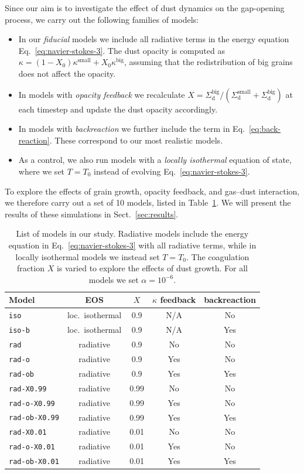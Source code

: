 \documentclass[fleqn,usenatbib,useAMS]{mnras}
\newcommand{\Sigmad}{\Sigma_\mathrm{d}}
\begin{document}
Since our aim is to investigate the effect of dust dynamics on the gap-opening process, we carry out the following families of models:
\begin{itemize}
	\item In our \emph{fiducial} models we include all radiative terms in the energy equation Eq.~\eqref{eq:navier-stokes-3}. The dust opacity is computed as $\kappa=(1-X_0)\kappa^\text{small} + X_0\kappa^\text{big}$, assuming that the redistribution of big grains does not affect the opacity.
	\item In models with \emph{opacity feedback} we recalculate $X=\Sigmad^\text{big}/(\Sigmad^\text{small}+\Sigmad^\text{big})$ at each timestep and update the dust opacity accordingly.
	\item In models with \emph{backreaction} we further include the term in Eq.~\eqref{eq:back-reaction}. These correspond to our most realistic models.
	\item As a control, we also run models with a \emph{locally isothermal} equation of state, where we set $T=T_0$ instead of evolving Eq.~\eqref{eq:navier-stokes-3}.
\end{itemize}

To explore the effects of grain growth, opacity feedback, and gas--dust interaction, we therefore carry out a set of 10 models, listed in Table~\ref{table:models}. We will present the results of these simulations in Sect.~\ref{sec:results}.

\begin{table}
	\centering
	\caption{List of models in our study. Radiative models include the energy equation in Eq.~\eqref{eq:navier-stokes-3} with all radiative terms, while in locally isothermal models we instead set $T=T_0$. The coagulation fraction $X$ is varied to explore the effects of dust growth. For all models we set $\alpha=10^{-6}$.}
	\label{table:models}
	\begin{tabular}{lcccc}
		\hline
		Model & EOS & $X$ & $\kappa$ feedback & backreaction\\
		\hline
		\texttt{iso} & loc.~isothermal & 0.9 & N/A & No\\
		\texttt{iso-b} & loc.~isothermal & 0.9 & N/A & Yes\\
		\texttt{rad} & radiative & 0.9 & No & No\\
		\texttt{rad-o} & radiative & 0.9 & Yes & No\\
		\texttt{rad-ob} & radiative & 0.9 & Yes & Yes\\
		\texttt{rad-X0.99} & radiative & 0.99 & No & No\\
		\texttt{rad-o-X0.99} & radiative & 0.99 & Yes & No\\
		\texttt{rad-ob-X0.99} & radiative & 0.99 & Yes & Yes\\
		\texttt{rad-X0.01} & radiative & 0.01 & No & No\\
		\texttt{rad-o-X0.01} & radiative & 0.01 & Yes & No\\
		\texttt{rad-ob-X0.01} & radiative & 0.01 & Yes & Yes\\
		\hline
	\end{tabular}
\end{table}
\end{document}
